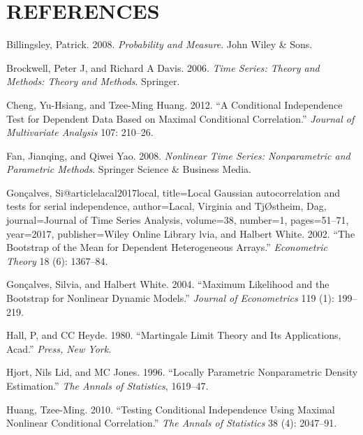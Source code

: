 \documentclass[
  12pt,
  letterpaper]{article}
\numberwithin{equation}{section}
\newlength{\cslhangindent}
\newenvironment{cslreferences}%
  {\setlength{\parindent}{0pt}%
  \everypar{\setlength{\hangindent}{\cslhangindent}}\ignorespaces}%
  {\par}
\begin{document}
\newpage

\hypertarget{references}{%
\section*{REFERENCES}\label{references}}

\hypertarget{refs}{}
\begin{cslreferences}
\leavevmode\hypertarget{ref-bill:2008}{}%
Billingsley, Patrick. 2008. \emph{Probability and Measure}. John Wiley \& Sons.

\leavevmode\hypertarget{ref-brockwell1991time}{}%
Brockwell, Peter J, and Richard A Davis. 2006. \emph{Time Series: Theory and Methods: Theory and Methods}. Springer.

\leavevmode\hypertarget{ref-cheng2012conditional}{}%
Cheng, Yu-Hsiang, and Tzee-Ming Huang. 2012. ``A Conditional Independence Test for Dependent Data Based on Maximal Conditional Correlation.'' \emph{Journal of Multivariate Analysis} 107: 210--26.

\leavevmode\hypertarget{ref-fan2008nonlinear}{}%
Fan, Jianqing, and Qiwei Yao. 2008. \emph{Nonlinear Time Series: Nonparametric and Parametric Methods}. Springer Science \& Business Media.

\leavevmode\hypertarget{ref-gonccalves2002bootstrap}{}%
Gonçalves, Si@articlelacal2017local, title=Local Gaussian autocorrelation and tests for serial independence, author=Lacal, Virginia and TjØstheim, Dag, journal=Journal of Time Series Analysis, volume=38, number=1, pages=51--71, year=2017, publisher=Wiley Online Library lvia, and Halbert White. 2002. ``The Bootstrap of the Mean for Dependent Heterogeneous Arrays.'' \emph{Econometric Theory} 18 (6): 1367--84.

\leavevmode\hypertarget{ref-gonccalves2004maximum}{}%
Gonçalves, Silvia, and Halbert White. 2004. ``Maximum Likelihood and the Bootstrap for Nonlinear Dynamic Models.'' \emph{Journal of Econometrics} 119 (1): 199--219.

\leavevmode\hypertarget{ref-hall1980martingale}{}%
Hall, P, and CC Heyde. 1980. ``Martingale Limit Theory and Its Applications, Acad.'' \emph{Press, New York}.

\leavevmode\hypertarget{ref-hjort1996locally}{}%
Hjort, Nils Lid, and MC Jones. 1996. ``Locally Parametric Nonparametric Density Estimation.'' \emph{The Annals of Statistics}, 1619--47.

\leavevmode\hypertarget{ref-huang2010testing}{}%
Huang, Tzee-Ming. 2010. ``Testing Conditional Independence Using Maximal Nonlinear Conditional Correlation.'' \emph{The Annals of Statistics} 38 (4): 2047--91.


\end{cslreferences}
\end{document}
